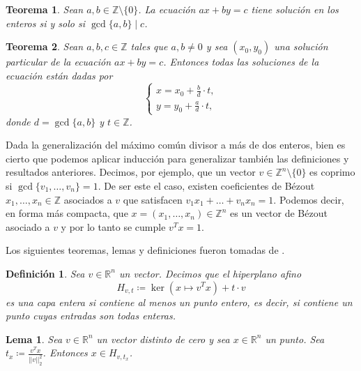 \documentclass[11pt]{article}
\newtheorem{definition}{Definición}
\newtheorem{theorem}{Teorema}
\newtheorem{lemma}{Lema}
\begin{document}
\begin{theorem}
	Sean $a, b \in \mathbb{Z} \setminus\lbrace 0 \rbrace$. La ecuación $ax + by = c$ tiene solución
	en los enteros si y solo si $\gcd\lbrace a, b \rbrace \mid c$.
\end{theorem}

\begin{theorem}
	Sean $a, b, c \in \mathbb{Z}$ tales que $a, b \neq 0$ y sea $(x_0, y_0)$ una solución particular
	de la ecuación $ax + by = c$. Entonces todas las soluciones de la ecuación están dadas por
	\begin{equation*}
		\begin{cases}
			x = x_0 + \frac{b}{d} \cdot t, \\
			y = y_0 + \frac{a}{d} \cdot t,
		\end{cases}
	\end{equation*}
	donde $d = \gcd\lbrace a, b \rbrace$ y $t \in \mathbb{Z}$.
\end{theorem}

Dada la generalización del máximo común divisor a más de dos enteros, bien es cierto que podemos
aplicar inducción para generalizar también las definiciones y resultados anteriores. Decimos, por
ejemplo, que un vector $v \in \mathbb{Z}^n \setminus \lbrace 0 \rbrace$ es coprimo si $\gcd\lbrace
v_1, \ldots, v_n \rbrace = 1$. De ser este el caso, existen coeficientes de Bézout $x_1, \ldots,
x_n \in \mathbb{Z}$ asociados a $v$ que satisfacen $v_1x_1 + \ldots + v_nx_n = 1$. Podemos decir, en
forma más compacta, que $x = (x_1, \ldots, x_n) \in \mathbb{Z}^n$ es un vector de Bézout asociado a
$v$ y por lo tanto se cumple $v^Tx = 1$.

Los siguientes teoremas, lemas y definiciones fueron tomadas de \cite{sip}.

\begin{definition}
	Sea $v \in \mathbb{R}^n$ un vector. Decimos que el hiperplano afino
	\begin{equation*}
		H_{v, t} \coloneq \ker(x \mapsto v^Tx) + t \cdot v
	\end{equation*}
	es una capa entera si contiene al menos un punto entero, es decir, si contiene un punto cuyas
	entradas son todas enteras.
\end{definition}

\begin{lemma}
	Sea $v \in \mathbb{R}^n$ un vector distinto de cero y sea $x \in \mathbb{R}^n$ un punto. Sea $t_x
	\coloneq \frac{v^Tx}{||v||_2^2}$. Entonces $x \in H_{v, t_x}$.
\end{lemma}
\end{document}
